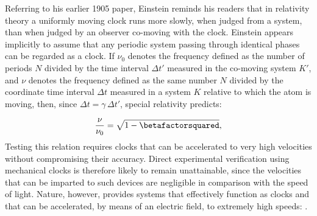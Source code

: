 \documentclass[pdflatex,sn-basic]{sn-jnl}
\newcommand{\tDe}{transverse Doppler effect\xspace}
\begin{document}
Referring to his earlier 1905 paper, Einstein reminds his readers that in relativity theory a uniformly moving clock runs more slowly, when judged from a  system, than when judged by an observer co-moving with the clock. Einstein appears implicitly to assume that any periodic system passing through identical phases can be regarded as a clock. If $\nu_0$ denotes the frequency defined as the number of periods $N$ divided by the time interval $\Delta t'$ measured in the co-moving system $K'$, and $\nu$ denotes the frequency defined as the same number $N$ divided by the coordinate time interval $\Delta t$ measured in a system $K$ relative to which the atom is moving, then, since $\Delta t=\gamma\,\Delta t'$, special relativity predicts:






\begin{equation}\label{eq:doppler}
\frac{\nu}{\nu_0}=\sqrt{1-\betafactorsquared},
\end{equation}
%
Testing this relation requires clocks that can be accelerated to very high velocities without compromising their accuracy. Direct experimental verification using mechanical clocks is therefore likely to remain unattainable, since the velocities that can be imparted to such devices are negligible in comparison with the speed of light. Nature, however, provides systems that effectively function as clocks and that can be accelerated, by means of an electric field, to extremely high speeds:  \citep[198]{Einstein1907d}.
\end{document}
